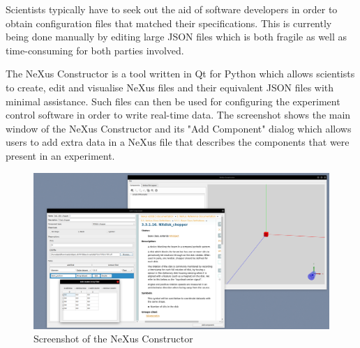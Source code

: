 Scientists typically have to seek out the aid of software developers in order to obtain configuration files that matched their specifications. This is currently being done manually by editing large JSON files which is both fragile as well as time-consuming for both parties involved.

The NeXus Constructor is a tool written in Qt for Python which allows scientists to create, edit and visualise NeXus files and their equivalent JSON files with minimal assistance. Such files can then be used for configuring the experiment control software in order to write real-time data. The screenshot shows the main window of the NeXus Constructor and its "Add Component" dialog which allows users to add extra data in a NeXus file that describes the components that were present in an experiment. %

\begin{figure}
\caption{Screenshot of the NeXus Constructor}
\includegraphics[width=\linewidth]{screenshot.png}
\end{figure}




